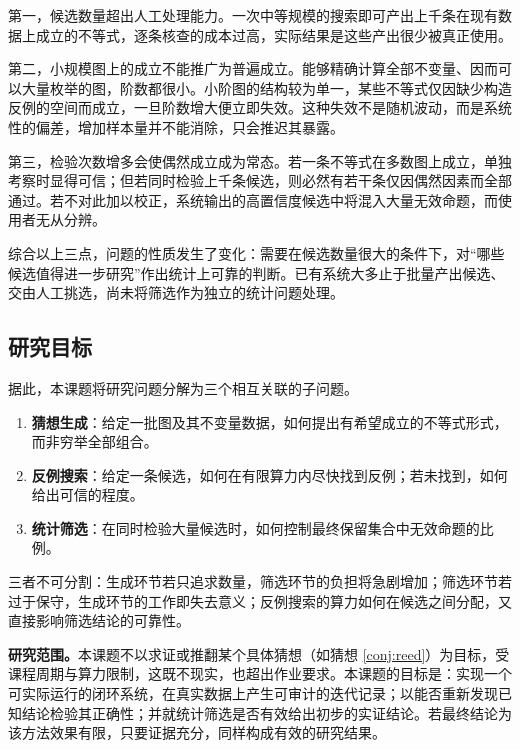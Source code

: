 第一，候选数量超出人工处理能力。一次中等规模的搜索即可产出上千条在现有数据上成立的不等式，逐条核查的成本过高，实际结果是这些产出很少被真正使用。

第二，小规模图上的成立不能推广为普遍成立。能够精确计算全部不变量、因而可以大量枚举的图，阶数都很小。小阶图的结构较为单一，某些不等式仅因缺少构造反例的空间而成立，一旦阶数增大便立即失效。这种失效不是随机波动，而是系统性的偏差，增加样本量并不能消除，只会推迟其暴露。

第三，检验次数增多会使偶然成立成为常态。若一条不等式在多数图上成立，单独考察时显得可信；但若同时检验上千条候选，则必然有若干条仅因偶然因素而全部通过。若不对此加以校正，系统输出的高置信度候选中将混入大量无效命题，而使用者无从分辨。

综合以上三点，问题的性质发生了变化：需要在候选数量很大的条件下，对“哪些候选值得进一步研究”作出统计上可靠的判断。已有系统大多止于批量产出候选、交由人工挑选，尚未将筛选作为独立的统计问题处理。

\subsection{研究目标}

据此，本课题将研究问题分解为三个相互关联的子问题。

\begin{enumerate}
  \item \textbf{猜想生成}：给定一批图及其不变量数据，如何提出有希望成立的不等式形式，而非穷举全部组合。
  \item \textbf{反例搜索}：给定一条候选，如何在有限算力内尽快找到反例；若未找到，如何给出可信的程度。
  \item \textbf{统计筛选}：在同时检验大量候选时，如何控制最终保留集合中无效命题的比例。
\end{enumerate}

三者不可分割：生成环节若只追求数量，筛选环节的负担将急剧增加；筛选环节若过于保守，生成环节的工作即失去意义；反例搜索的算力如何在候选之间分配，又直接影响筛选结论的可靠性。

\textbf{研究范围。}本课题不以求证或推翻某个具体猜想（如猜想 \ref{conj:reed}）为目标，受课程周期与算力限制，这既不现实，也超出作业要求。本课题的目标是：实现一个可实际运行的闭环系统，在真实数据上产生可审计的迭代记录；以能否重新发现已知结论检验其正确性；并就统计筛选是否有效给出初步的实证结论。若最终结论为该方法效果有限，只要证据充分，同样构成有效的研究结果。
